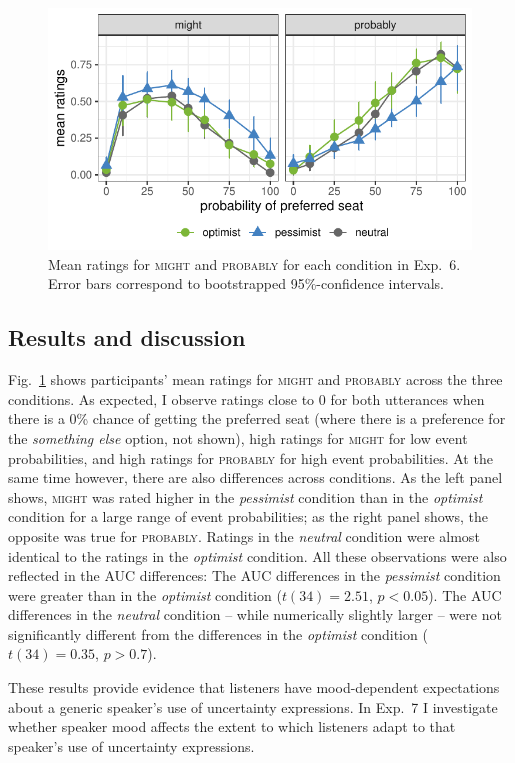\begin{figure}[t]
    \centering
    \includegraphics[width=0.75\columnwidth, trim={0 0.75cm 0 0cm}]{./plots/norming.pdf}
    \caption{Mean ratings for \textsc{might} and \textsc{probably} for each condition in Exp.~6. Error bars correspond to bootstrapped 95\%-confidence intervals.}
    \label{fig:results-exp6}
\end{figure}

\subsection{Results and discussion}

Fig.~\ref{fig:results-exp6} shows participants' mean ratings for \textsc{might} and \textsc{probably} across the three conditions. As expected, I observe ratings close to 0 for both utterances when there is a 0\% chance of getting the preferred seat (where there is a preference for the \textit{something else} option, not shown), high ratings for \textsc{might} for low event probabilities, and high ratings for \textsc{probably} for high event probabilities. At the same time however, there are also differences across conditions. As the left panel shows, \textsc{might} was rated higher in the \textit{pessimist} condition than in the \textit{optimist} condition for a large range of event probabilities; as the right panel shows, the opposite was true for \textsc{probably}. Ratings in the \textit{neutral} condition were almost identical to the ratings in the \textit{optimist} condition. All these observations were also reflected in the AUC differences: The AUC differences in the \textit{pessimist} condition were greater than in the \textit{optimist} condition ($t(34)=2.51$, $p < 0.05$). The AUC differences in the \textit{neutral} condition -- while numerically slightly larger -- were not significantly different from the differences in the \textit{optimist} condition ($t(34)=0.35$, $p>0.7$).

These results provide evidence that listeners have mood-dependent expectations about a generic speaker's use of uncertainty expressions. In Exp.~7 I investigate whether  speaker mood affects the extent to which listeners adapt to that speaker's use of uncertainty expressions.  %

